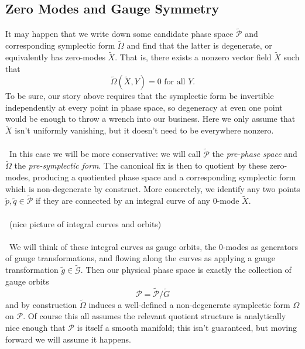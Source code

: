 \documentclass[11pt,letterpaper]{article}
\newcommand{\mc}[1]{\mathcal{#1}}
\begin{document}
\subsection{Zero Modes and Gauge Symmetry}
It may happen that we write down some candidate phase space $\tilde{\mc{P}}$ and corresponding symplectic form $\tilde{\Omega}$ and find that the latter is degenerate, or equivalently has zero-modes $\tilde{X}$. That is, there exists a nonzero vector field $\tilde{X}$ such that \begin{equation}
\tilde{\Omega}(\tilde{X}, Y) = 0 \mbox{ for all } Y.
\end{equation}
To be sure, our story above requires that the symplectic form be invertible independently at every point in phase space, so degeneracy at even one point would be enough to throw a wrench into our business. Here we only assume that $\tilde{X}$ isn't uniformly vanishing, but it doesn't need to be everywhere nonzero. \\
\\
\
In this case we will be more conservative: we will call $\tilde{\mc{P}}$ the \textit{pre-phase space} and $\tilde{\Omega}$ the \textit{pre-symplectic form}. The canonical fix is then to quotient by these zero-modes, producing a quotiented phase space and a corresponding symplectic form which is non-degenerate by construct. More concretely,  we identify any two points $\tilde{p}, \tilde{q} \in \tilde{\mc{P}}$ if they are connected by an integral curve of any 0-mode $\tilde{X}$. \\
\\
\
(nice picture of integral curves and orbits)\\
\\
\
We will think of these integral curves as gauge orbits, the 0-modes as generators of gauge transformations, and flowing along the curves as applying a gauge transformation $\tilde{g} \in \tilde{\mc{G}}$. Then our physical phase space is exactly the collection of gauge orbits \begin{equation}
\mc{P} = \tilde{\mc{P}} / \tilde{G}
\end{equation}
and by construction $\tilde{\Omega}$ induces a well-defined a non-degenerate symplectic form $\Omega$ on $\mc{P}$. Of course this all assumes the relevant quotient structure is analytically nice enough that $\mc{P}$ is itself a smooth manifold; this isn't guaranteed, but moving forward we will assume it happens.
\end{document}
